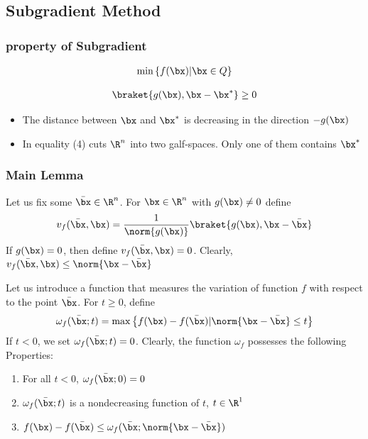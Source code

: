 \subsection{Subgradient Method}
\subsubsection{property of Subgradient}
\begin{align*}
    \min \left\{ f(\bx)|\bx\in Q \right\}
\end{align*}

\begin{align*}
    \braket{g(\bx), \bx-\bx^*}\ge 0
\end{align*}
\begin{itemize}
    \item The distance between $\bx$ and $\bx^*$ is decreasing in the direction $-g(\bx)$
    \item In equality (4) cuts $\R^n$ into two galf-spaces. Only one of them contains $\bx^*$
\end{itemize}

\subsubsection{Main Lemma}
Let us fix some $\bar{\bx}\in\R^n$. For $\bx\in\R^n$ with $g(\bx)\ne 0$ define
\begin{align*}
    v_f(\bar{\bx}, \bx)=\frac{1}{\norm{g(\bx)}}\braket{g(\bx), \bx-\bar{\bx}}
\end{align*}
If $g(\bx)=0$, then define $v_f(\bar{\bx}, \bx)=0$. Clearly, $v_f(\bar{\bx}, \bx)\le \norm{\bx-\bar{\bx}}$



Let us introduce a function that measures the variation of function $f$ with respect to the point $\bar{\bx}$. For $t\ge 0$, define
\begin{align*}
    \omega_f(\bar{\bx};t)=\max\left\{ f(\bx)-f(\bar{\bx})|\norm{\bx-\bar{\bx}}\le t \right\}
\end{align*}
If $t<0$, we set $\omega_f(\bar{\bx};t)=0$. Clearly, the function $\omega_f$ possesses the following Properties:
\begin{enumerate}
    \item For all $t<0$, $\omega_f(\bar{\bx};0)=0$
    \item $\omega_f(\bar{\bx};t)$ is a nondecreasing function of $t$, $t\in\R^1$
    \item $f(\bx)-f(\bar{\bx})\le \omega_f(\bar{\bx};\norm{\bx-\bar{\bx}})$
\end{enumerate}


